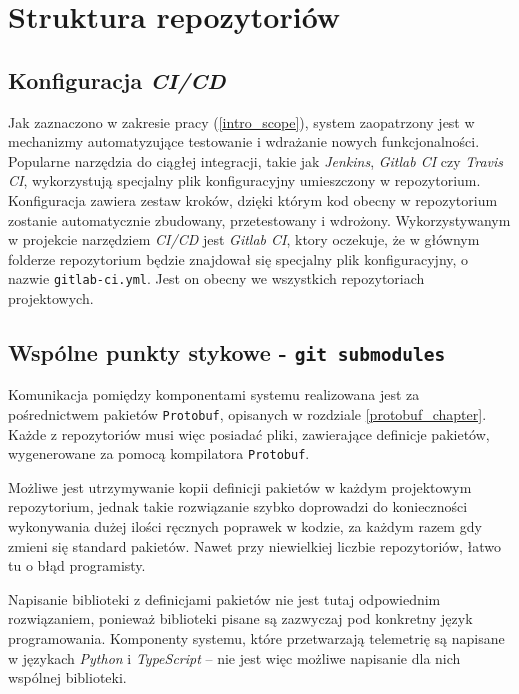 \section{Struktura repozytoriów} \label{repo_structure}

\subsection{Konfiguracja \textit{CI/CD}}

Jak zaznaczono w zakresie pracy (\ref{intro_scope}), system zaopatrzony jest w  
mechanizmy automatyzujące testowanie i wdrażanie nowych 
funkcjonalności. Popularne narzędzia do ciągłej integracji, takie jak
\textit{Jenkins}, \textit{Gitlab CI} czy \textit{Travis CI}, wykorzystują specjalny
plik konfiguracyjny umieszczony w repozytorium. Konfiguracja zawiera zestaw kroków,
dzięki którym kod obecny w repozytorium zostanie automatycznie
zbudowany, przetestowany i wdrożony. Wykorzystywanym w projekcie narzędziem \textit{CI/CD}
jest \textit{Gitlab CI}, ktory oczekuje, że w głównym folderze repozytorium będzie 
znajdował się specjalny plik konfiguracyjny, o nazwie \texttt{gitlab-ci.yml}. 
Jest on obecny we wszystkich repozytoriach projektowych.


\subsection{Wspólne punkty stykowe - \texttt{git submodules}}

Komunikacja pomiędzy komponentami systemu realizowana jest za pośrednictwem
pakietów \texttt{Protobuf}, opisanych w rozdziale \ref{protobuf_chapter}.
Każde z repozytoriów musi więc posiadać pliki, zawierające definicje pakietów,
wygenerowane za pomocą kompilatora \texttt{Protobuf}. 

Możliwe jest utrzymywanie kopii definicji pakietów w każdym projektowym repozytorium,
jednak takie rozwiązanie szybko doprowadzi do konieczności wykonywania dużej ilości
ręcznych poprawek w kodzie, za każdym razem gdy zmieni się standard pakietów. 
Nawet przy niewielkiej liczbie repozytoriów, łatwo tu o błąd programisty. 

Napisanie biblioteki z definicjami pakietów nie jest tutaj odpowiednim rozwiązaniem, 
ponieważ biblioteki pisane są zazwyczaj pod konkretny język programowania. Komponenty
systemu, które przetwarzają telemetrię są napisane w językach \textit{Python} i 
\textit{TypeScript} -- nie jest więc możliwe napisanie dla nich wspólnej biblioteki.

